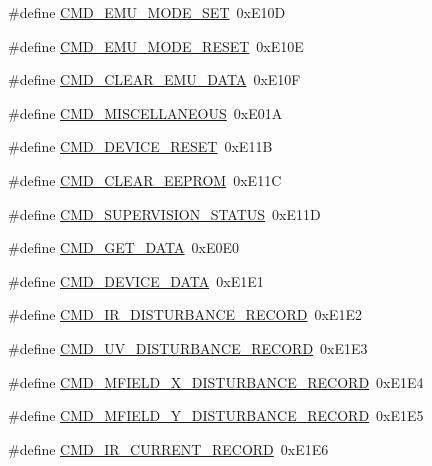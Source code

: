 \begin{DoxyCompactItemize}
\item 
\#define \hyperlink{a00021_ac80fdfdbada05f61256bef39c2064330}{C\+M\+D\+\_\+\+E\+M\+U\+\_\+\+M\+O\+D\+E\+\_\+\+S\+E\+T}~0x\+E10\+D
\item 
\#define \hyperlink{a00021_a48532ee6ce8c4c41bc6a972f66998ca6}{C\+M\+D\+\_\+\+E\+M\+U\+\_\+\+M\+O\+D\+E\+\_\+\+R\+E\+S\+E\+T}~0x\+E10\+E
\item 
\#define \hyperlink{a00021_aa5f71f685588bc4e978cd6d595a5ea81}{C\+M\+D\+\_\+\+C\+L\+E\+A\+R\+\_\+\+E\+M\+U\+\_\+\+D\+A\+T\+A}~0x\+E10\+F
\item 
\#define \hyperlink{a00021_a1c028104d44ece3aca38373da0345c04}{C\+M\+D\+\_\+\+M\+I\+S\+C\+E\+L\+L\+A\+N\+E\+O\+U\+S}~0x\+E01\+A
\item 
\#define \hyperlink{a00021_ac4c8a78ea50054745a0ac0792baa7657}{C\+M\+D\+\_\+\+D\+E\+V\+I\+C\+E\+\_\+\+R\+E\+S\+E\+T}~0x\+E11\+B
\item 
\#define \hyperlink{a00021_a9084e0a84e73318b6fad9841fb4d4f98}{C\+M\+D\+\_\+\+C\+L\+E\+A\+R\+\_\+\+E\+E\+P\+R\+O\+M}~0x\+E11\+C
\item 
\#define \hyperlink{a00021_ad6af9210ac0903986f3ac3e55c6816a3}{C\+M\+D\+\_\+\+S\+U\+P\+E\+R\+V\+I\+S\+I\+O\+N\+\_\+\+S\+T\+A\+T\+U\+S}~0x\+E11\+D
\item 
\#define \hyperlink{a00021_af89ae6f2252e558fc6e54ea9b452bf0e}{C\+M\+D\+\_\+\+G\+E\+T\+\_\+\+D\+A\+T\+A}~0x\+E0\+E0
\item 
\#define \hyperlink{a00021_a4412fcb90fb9171d432a624428881e70}{C\+M\+D\+\_\+\+D\+E\+V\+I\+C\+E\+\_\+\+D\+A\+T\+A}~0x\+E1\+E1
\item 
\#define \hyperlink{a00021_ad37cd290161f0a245d189c3f4e014d4e}{C\+M\+D\+\_\+\+I\+R\+\_\+\+D\+I\+S\+T\+U\+R\+B\+A\+N\+C\+E\+\_\+\+R\+E\+C\+O\+R\+D}~0x\+E1\+E2
\item 
\#define \hyperlink{a00021_ae45bb46748497c6a117beb1e93072d83}{C\+M\+D\+\_\+\+U\+V\+\_\+\+D\+I\+S\+T\+U\+R\+B\+A\+N\+C\+E\+\_\+\+R\+E\+C\+O\+R\+D}~0x\+E1\+E3
\item 
\#define \hyperlink{a00021_ab84aea346a3f75b58f8bda67b8ae9be0}{C\+M\+D\+\_\+\+M\+F\+I\+E\+L\+D\+\_\+\+X\+\_\+\+D\+I\+S\+T\+U\+R\+B\+A\+N\+C\+E\+\_\+\+R\+E\+C\+O\+R\+D}~0x\+E1\+E4
\item 
\#define \hyperlink{a00021_af77e9c0ad32b3cc50d61992d4b64a831}{C\+M\+D\+\_\+\+M\+F\+I\+E\+L\+D\+\_\+\+Y\+\_\+\+D\+I\+S\+T\+U\+R\+B\+A\+N\+C\+E\+\_\+\+R\+E\+C\+O\+R\+D}~0x\+E1\+E5
\item 
\#define \hyperlink{a00021_a4dcce4fd3ff29eb6782f3228901f99cf}{C\+M\+D\+\_\+\+I\+R\+\_\+\+C\+U\+R\+R\+E\+N\+T\+\_\+\+R\+E\+C\+O\+R\+D}~0x\+E1\+E6

\end{DoxyCompactItemize}
